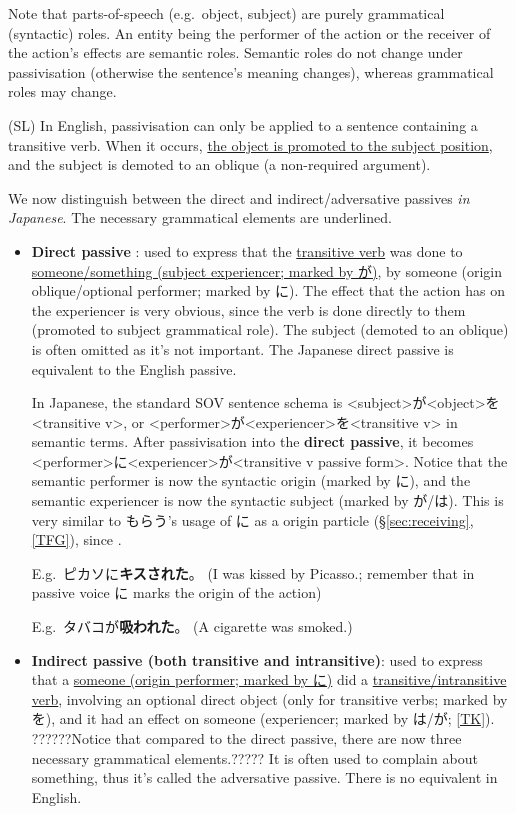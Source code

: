 \documentclass[../nihongo-gakushuu-kyouzai.tex]{subfiles}
\begin{document}
Note that parts-of-speech (e.g.\ object, subject) are purely grammatical (syntactic) roles. An entity being the performer of the action or the receiver of the action's effects are semantic roles. Semantic roles do not change under passivisation (otherwise the sentence's meaning changes), whereas grammatical roles may change.

(SL) In English, passivisation can only be applied to a sentence containing a transitive verb. When it occurs, \ul{the object is promoted to the subject position}, and the subject is demoted to an oblique (a non-required argument).


We now distinguish between the direct and indirect/adversative passives \emph{in Japanese}. The necessary grammatical elements are underlined.
\begin{itemize}
    \item \textbf{Direct passive }: used to express that the \ul{transitive verb} was done to \ul{someone/something (subject experiencer; marked by が)}, by someone (origin oblique/optional performer; marked by に). The effect that the action has on the experiencer is very obvious, since the verb is done directly to them (promoted to subject grammatical role). The subject (demoted to an oblique) is often omitted as it's not important. The Japanese direct passive is equivalent to the English passive.

    In Japanese, the standard SOV sentence schema is <subject>が<object>を<transitive v>, or <performer>が<experiencer>を<transitive v> in semantic terms. After passivisation into the \textbf{direct passive}, it becomes <performer>に<experiencer>が<transitive v passive form>. Notice that the semantic performer is now the syntactic origin (marked by に), and the semantic experiencer is now the syntactic subject (marked by が/は). This is very similar to もらう's usage of に as a origin particle (\S\ref{sec:receiving}, \href{https://www.tofugu.com/japanese-grammar/particle-ni/\#in-social-interactions-and-transactions}{[TFG]}), since .

    E.g.\ ピカソに\textbf{キスされた}。 (I was kissed by Picasso.; remember that in passive voice に marks the origin of the action)

    E.g.\ タバコが\textbf{吸われた}。 (A cigarette was smoked.)

    \item \textbf{Indirect passive (both transitive and intransitive)}: used to express that a \ul{someone (origin performer; marked by に)} did a \ul{transitive/intransitive verb}, involving an optional direct object (only for transitive verbs; marked by を), and it had an effect on someone (experiencer; marked by は/が; \href{https://www.guidetojapanese.org/blog/2005/09/09/no-suffering-passive/\#comment-9210}{[TK]}). ??????Notice that compared to the direct passive, there are now three necessary grammatical elements.????? It is often used to complain about something, thus it's called the adversative passive. There is no equivalent in English.


\end{itemize}
\end{document}
